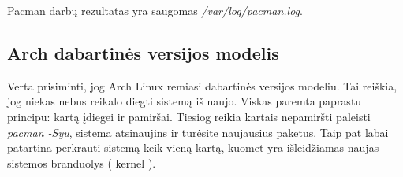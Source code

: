       Pacman darbų rezultatas yra saugomas \textsl{/var/log/pacman.log}.

      \subsection{Arch dabartinės versijos modelis}

        Verta prisiminti, jog Arch Linux remiasi dabartinės versijos
        modeliu. Tai reiškia, jog niekas nebus reikalo diegti sistemą
        iš naujo. Viskas paremta paprastu principu: kartą įdiegei ir
        pamiršai. Tiesiog reikia kartais nepamiršti paleisti
        \textsl{pacman -Syu}, sistema atsinaujins ir turėsite
        naujausius paketus. Taip pat labai patartina perkrauti sistemą
        keik vieną kartą, kuomet yra išleidžiamas naujas sistemos
        branduolys ( kernel ).
